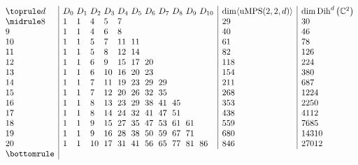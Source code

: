 \documentclass[10pt,a4paper]{amsart}
\numberwithin{equation}{section}
\newcommand{\CC}{\mathbb{C}}
\DeclareMathOperator{\uMPS}{uMPS}
\DeclareMathOperator{\Dih}{Dih}
\begin{document}
 \begin{table}[th]\centering
	\caption{Character of $\langle \uMPS(2,2,d) \rangle$. Since $D_{w}=D_{d-w}$ (more generally: for every ${\rm GL}_2$-re\-pre\-sen\-tation~$V$ we have that $V_{(b_0,b_1)}=V_{(b_1,b_0)}$), we only list $D_w$ for $w \leq \big\lceil \frac{d}{2}\big\rceil$. The dimension of $\langle \uMPS(2,2,d) \rangle$ equals twice the sum of the $D_w$'s if $d$ is odd, and twice the sum of the $D_w$'s minus the last $D_w$ if $d$ is even.}\label{table:character}

\vspace{-5mm}

$$
	\begin{array}{@{\,}l|l@{\,\,}l@{\,\,}l@{\,\,}l@{\,\,}l@{\,\,}l@{\,\,}l@{\,\,}l@{\,\,}l@{\,\,}l@{\,\,}l|l|l@{\,}}
	\toprule
	d & D_0	& D_1 	& D_2 	& D_3 	& D_4 & D_5 & D_6 & D_7 & D_8 & D_9 & D_{10} &\dim \langle\uMPS(2,2,d)\rangle & \dim \Dih^d\big(\CC^2\big)\\
	\midrule
	8 & 1 	& 1 	& 4 	& 5 	& 7  	&  &   &  &  &&& 29 & 30\\
	9 & 1	& 1 	& 4 	& 6 	& 8  	&  &  & & &&& 40 & 46\\
	10 & 1 	& 1 	& 5 	& 7 	& 11 	& 11 &  & &   &  && 61 & 78\\
	11 &  1 & 1 	& 5 	& 8 	& 12 	& 14 &  & &   &  && 82 & 126\\
	12 &  1	& 1 	& 6 	& 9 	& 15 	& 17 & 20 &  &  &  && 118 & 224\\
	13 &  1	& 1 	& 6 	& 10 	& 16 	& 20 & 23 &  &  &  && 154 & 380\\
	14 & 1 	& 1 	& 7		& 11	& 19 	& 23 & 29 & 29&  &  && 211 & 687\\
	15 & 1 	& 1 	& 7		& 12 	& 20 	& 26 & 32 & 35&  &  && 268 & 1224\\
	16 & 1 	& 1 	& 8		& 13 	& 23 	& 29 & 38 &41 & 45 &  && 353 & 2250\\
	17 & 1  & 1     & 8     & 14    & 24    & 32 & 41 & 47 & 51  &  && 438 & 4112\\
	18 & 1  & 1     & 9     & 15    & 27    & 35 & 47 & 53 & 61 & 61 && 559 & 7685 \\
	19 & 1  & 1     & 9     & 16    & 28    & 38 & 50 & 59 & 67 & 71 && 680 & 14310 \\
    20 & 1  & 1     & 10    & 17    & 31    & 41 & 56 & 65 & 77 & 81 & 86 & 846 & 27012\\
	\bottomrule
	\end{array}$$
\vspace{-2mm}
\end{table}
\end{document}
